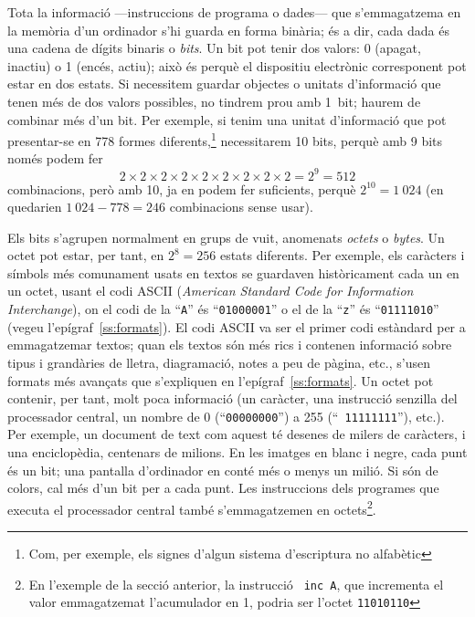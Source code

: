 Tota la informació ---instruccions de programa o dades--- que
s'emmagatzema en la memòria d'un ordinador s'hi guarda en forma
binària; és a dir, cada dada és una cadena de dígits
binaris o \emph{bits}. Un bit pot tenir dos valors: 0 (apagat, inactiu)
o 1 (encés, actiu); això és perquè el dispositiu
electrònic corresponent pot estar en dos estats. Si necessitem
guardar objectes o unitats d'informació que tenen més de dos
valors possibles, no tindrem prou amb 1~bit; haurem de combinar
més d'un bit. Per exemple, si tenim una unitat d'informació
que pot presentar-se en 778 formes diferents,\footnote{Com, per
  exemple, els signes d'algun sistema d'escriptura no alfabètic}
necessitarem 10 bits, perquè amb 9 bits només podem fer $$2
\times 2 \times 2 \times 2 \times 2 \times 2 \times 2 \times 2 \times
2 = 2^9 = 512$$
combinacions, però amb 10, ja en podem fer
suficients, perquè $2^{10}=1~024$ (en quedarien $1~024-778=246$
combinacions sense usar).

Els bits s'agrupen normalment en grups de vuit, anomenats {\em octets}
o \emph{bytes}. Un octet pot estar, per tant, en $2^8=256$ estats
diferents. Per exemple, els caràcters i símbols més comunament
usats en textos se guardaven històricament cada un en un octet, usant
el codi ASCII\label{pg:ASCII} (\emph{American Standard Code for
  Information Interchange}), on el codi de la ``{\tt A}'' és
``{\tt 01000001}'' o el de la ``{\tt z}'' és ``{\tt 01111010}''
(vegeu l'epígraf~\ref{ss:formats}).  El codi ASCII va ser el primer
codi estàndard per a emmagatzemar textos; quan els textos són més rics
i contenen informació sobre tipus i grandàries de lletra, diagramació,
notes a peu de pàgina, etc., s'usen formats més avançats que
s'expliquen en l'epígraf~\ref{ss:formats}.  Un octet pot contenir, per
tant, molt poca informació (un caràcter, una instrucció senzilla del
processador central, un nombre de 0 (``{\tt 00000000}'') a 255 (``{\tt
  11111111}''), etc.).  Per exemple, un document de text com aquest
té desenes de milers de caràcters, i una enciclopèdia, centenars
de milions. En les imatges en blanc i negre, cada punt és un bit;
una pantalla d'ordinador en conté més o menys un milió. Si són
de colors, cal més d'un bit per a cada punt. Les instruccions dels
programes que executa el processador central també s'emmagatzemen
en octets\footnote{En l'exemple de la secció anterior, la instrucció {\tt
    inc A}, que incrementa el valor emmagatzemat l'acumulador en 1,
  podria ser l'octet {\tt 11010110}}.


